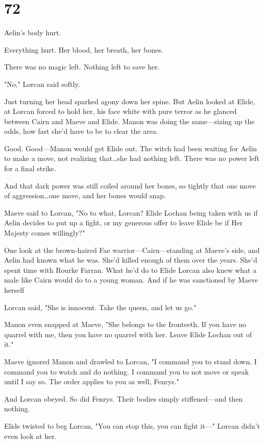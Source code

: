 
\chapter{72}

Aelin's body hurt.

Everything hurt.
Her blood, her breath, her bones.

There was no magic left.
Nothing left to save her.

"No," Lorcan said softly.

Just turning her head sparked agony down her spine.
But Aelin looked at Elide, at Lorcan forced to hold her, his face white with pure terror as he glanced between Cairn and Maeve and Elide.
Manon was doing the same---sizing up the odds, how fast she'd have to be to clear the area.

Good.
Good---Manon would get Elide out.
The witch had been waiting for Aelin to make a move, not realizing that\ldots she had nothing left.
There was no power left for a final strike.

And that dark power was still coiled around her bones, so tightly that one move of aggression\ldots one move, and her bones would snap.

Maeve said to Lorcan, "No to what, Lorcan?
Elide Lochan being taken with us if Aelin decides to put up a fight, or my generous offer to leave Elide be if Her Majesty comes willingly?"

One look at the brown-haired Fae warrior---Cairn---standing at Maeve's side, and Aelin had known what he was.
She'd killed enough of them over the years.
She'd spent time with Rourke Farran.
What he'd do to Elide  Lorcan also knew what a male like Cairn would do to a young woman.
And if he was sanctioned by Maeve herself 

Lorcan said, "She is innocent.
Take the queen, and let us go."

Manon even snapped at Maeve, "She belongs to the Ironteeth.
If you have no quarrel with me, then you have no quarrel with her.
Leave Elide Lochan out of it."

Maeve ignored Manon and drawled to Lorcan, "I command you to stand down.
I command you to watch and do nothing.
I command you to not move or speak until I say so.
The order applies to you as well, Fenrys."

And Lorcan obeyed.
So did Fenrys.
Their bodies simply stiffened---and then nothing.

Elide twisted to beg Lorcan, "You can stop this, you can fight it---" Lorcan didn't even look at her.

